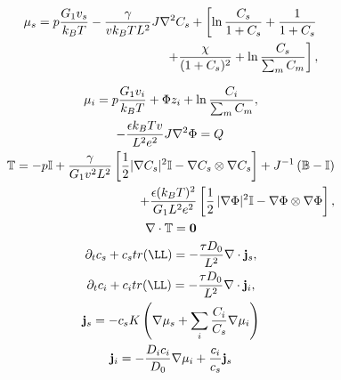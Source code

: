 \begin{gather}
\begin{aligned}
\mu_s = p \frac{G_1v_s}{k_BT} - \frac{\gamma}{vk_BT L^2} J \nabla^2 C_s + \left[\ln \frac{C_s}{1+C_s} + \frac{1}{1+C_s}\right.\\
\left.\ \ \ \ \ \ +\frac{\chi}{(1+C_s)^2} + \ln \frac{C_s}{\sum_m C_m} \right], 
\end{aligned}\\[2.5mm]
\mu_i = p \frac{G_1v_i}{k_BT} + \Phi z_i + \ln \frac{C_i}{\sum_m C_m} ,\\
-\frac{\epsilon k_B Tv}{L^2e^2} J \nabla^2 \Phi = Q\, \\
\begin{aligned}
\mathbb{T}= -p \mathbb{I} +\frac{\gamma }{G_1v^2L^2} \left[\frac{1}{2} |\nabla C_s|^2\mathbb{I} - \nabla C_s \otimes \nabla C_s\right]+ J^{-1}\left(\mathbb{B}-\mathbb{I}\right)\\
+ \frac{\epsilon (k_BT)^2}{G_1L^2e^2} \left[\frac{1}{2} \,|\nabla \Phi|^2\mathbb{I} -\nabla \Phi \otimes \nabla \Phi\right],
\end{aligned}\\
\nabla \cdot \mathbb{T}=\mathbf{0}\\
\partial_t c_s + c_s tr(\LL)=- \frac{\tau D_0}{L^2}\nabla \cdot\mathbf{j}_s,\\
\partial_t c_i + c_i tr(\LL)= -\frac{\tau D_0}{L^2}\nabla\cdot\mathbf{j}_i,\\
\mathbf{j}_s =-c_sK  \left(\nabla \mu_s +\sum_i \frac{C_i}{C_s} \nabla \mu_i\right)\\
\mathbf{j}_i= - \frac{D_ic_i}{D_0}\nabla \mu_i + \frac{c_i}{c_s}\mathbf{j}_s
\end{gather}


